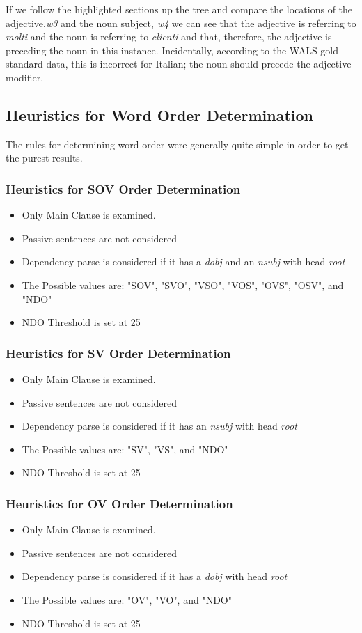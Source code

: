 \documentclass[]{aiaa-tc}
\begin{document}
If we follow the highlighted sections up the tree and compare the locations of the adjective,\textit{w3} and the noun subject, \textit{w4} we can see that the adjective is referring to \textit{molti} and the noun is referring to \textit{clienti} and that, therefore, the adjective is preceding the noun in this instance.  Incidentally, according to the WALS gold standard data, this is incorrect for Italian; the noun should precede the adjective modifier.


\subsection{Heuristics for Word Order Determination}
The rules for determining word order were generally quite simple in order to get the purest results.

\subsubsection{Heuristics for SOV Order Determination}
\begin{itemize}
    \item Only Main Clause is examined.
    \item Passive sentences are not considered
    \item Dependency parse is considered if it has a \textit{dobj} and an \textit{nsubj} with head \textit{root}
    \item The Possible values are: "SOV", "SVO", "VSO", "VOS", "OVS", "OSV", and "NDO"
    \item NDO Threshold is set at 25%
\end{itemize}
\subsubsection{Heuristics for SV Order Determination}
\begin{itemize}
    \item Only Main Clause is examined.
    \item Passive sentences are not considered
    \item Dependency parse is considered if it has an \textit{nsubj} with head \textit{root}
    \item The Possible values are: "SV", "VS", and "NDO"
    \item NDO Threshold is set at 25%
\end{itemize}
\subsubsection{Heuristics for OV Order Determination}
\begin{itemize}
    \item Only Main Clause is examined.
    \item Passive sentences are not considered
    \item Dependency parse is considered if it has a \textit{dobj} with head \textit{root}
    \item The Possible values are: "OV", "VO", and "NDO" 
    \item NDO Threshold is set at 25%
\end{itemize}
\end{document}

